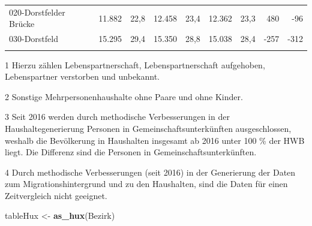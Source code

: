 \documentclass[
  a4paper,
  twoside]{article}
\newenvironment{Shaded}{\begin{snugshade}}{\end{snugshade}}
\newcommand{\KeywordTok}[1]{\textcolor[rgb]{0.13,0.29,0.53}{\textbf{#1}}}
\newcommand{\NormalTok}[1]{#1}
\newcommand{\StringTok}[1]{\textcolor[rgb]{0.31,0.60,0.02}{#1}}
\begin{document}
\begin{table}[H]
{\begin{threeparttable}
\begin{tabular}[t]{>{}l>{}r>{}r>{}r>{}r>{}r>{}r>{}r>{}r}
\hspace{1em}\hspace{1em}\textcolor{DoGray}{020-Dorstfelder Brücke} & \textcolor{DoGray}{11.882} & \textcolor{DoGray}{22,8} & \textcolor{DoGray}{12.458} & \textcolor{DoGray}{23,4} & \textcolor{DoGray}{12.362} & \textcolor{DoGray}{23,3} & \textcolor{DoGray}{480} & \textcolor{DoGray}{-96}\\
\hspace{1em}\hspace{1em}\textcolor{DoGray}{030-Dorstfeld} & \textcolor{DoGray}{15.295} & \textcolor{DoGray}{29,4} & \textcolor{DoGray}{15.350} & \textcolor{DoGray}{28,8} & \textcolor{DoGray}{15.038} & \textcolor{DoGray}{28,4} & \textcolor{DoGray}{-257} & \textcolor{DoGray}{-312}\\
\arrayrulecolor{DoGray}
\bottomrule
\end{tabular}
\begin{tablenotes}
\small
\item[1] \textcolor{DoGray}{Hierzu zählen Lebenspartnerschaft, Lebenspartnerschaft aufgehoben, Lebenspartner verstorben und unbekannt.}
\item[2] \textcolor{DoGray}{Sonstige Mehrpersonenhaushalte ohne Paare und ohne Kinder.}
\item[3] \textcolor{DoGray}{Seit 2016 werden durch methodische Verbesserungen in der Haushaltegenerierung Personen in Gemeinschaftsunterkünften ausgeschlossen, weshalb die Bevölkerung in Haushalten insgesamt ab 2016 unter 100 \% der HWB liegt. Die Differenz sind die Personen in Gemeinschaftsunterkünften.}
\item[4] \textcolor{DoGray}{Durch methodische Verbesserungen (seit 2016) in der Generierung der Daten zum Migrationshintergrund und zu den Haushalten, sind die Daten für einen Zeitvergleich nicht geeignet.}
\end{tablenotes}
\end{threeparttable}}
\end{table}

\begin{Shaded}
\begin{Highlighting}[]
\NormalTok{tableHux <-}\StringTok{ }\KeywordTok{as_hux}\NormalTok{(Bezirk)}
\end{Highlighting}
\end{Shaded}
\end{document}
